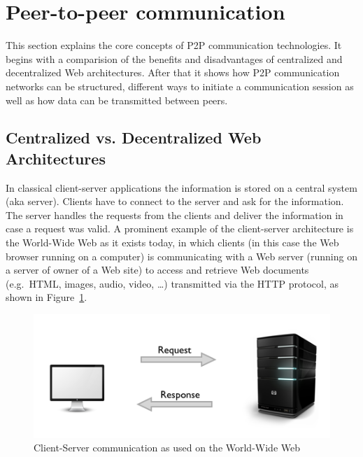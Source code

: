 
\section{Peer-to-peer communication}
\label{sec:p2p_communication}

This section explains the core concepts of \gls{P2P} communication technologies. It begins with a comparision of the benefits and disadvantages of centralized and decentralized Web architectures. After that it shows how \gls{P2P} communication networks can be structured, different ways to initiate a communication session as well as how data can be transmitted between peers.

\subsection{Centralized vs. Decentralized Web Architectures}
\label{sec:central_decentral_arch}

In classical client-server applications the information is stored on a central system (aka server). Clients have to connect to the server and ask for the information. The server handles the requests from the clients and deliver the information in case a request was valid. A prominent example of the client-server architecture is the World-Wide Web as it exists today, in which clients (in this case the Web browser running on a computer) is communicating with a Web server (running on a server of owner of a Web site) to access and retrieve Web documents (e.g.\ \gls{HTML}, images, audio, video, \ldots) transmitted via the \gls{HTTP} protocol, as shown in Figure~\ref{fig:p2p_central_server}. \@

\begin{figure}[H]
	\centering
		\includegraphics[width=0.9\columnwidth]{images/client-server-web.png}
	\caption[Client-Server communication as used on the World-Wide Web]{Client-Server communication as used on the World-Wide Web \citep{codeTuts}}
\label{fig:p2p_central_server}
\end{figure}

